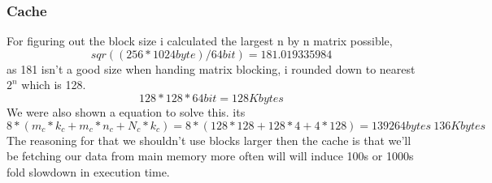 \documentclass[a4paper,10pt,titlepage]{report}
\begin{document}
\subsubsection{Cache}
For figuring out the block size i calculated the largest n by n matrix possible,
\begin{equation}
sqr((256*1024 byte)/64 bit) = 181.019335984
\end{equation}
as 181 isn't a good size when handing matrix blocking, i rounded down to nearest $2^n$ which is 128.
\begin{equation}
128 * 128 * 64 bit = 128 Kbytes
\end{equation}
We were also shown a equation to solve this. its 
\begin{equation}
8* (m_c*k_c+m_c*n_c+N_c*k_c) = 8* (128*128+128*4+4*128) = 139264 bytes ~ 136 Kbytes
\end{equation}
The reasoning for that we shouldn't use blocks larger then the cache is that we'll be fetching our data from main memory more often will will induce 100s or 1000s fold slowdown in execution time.\\
\newpage
\end{document}
